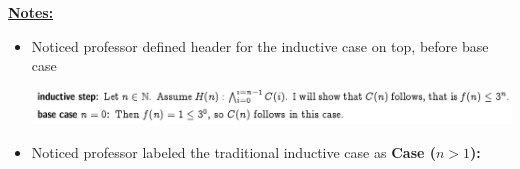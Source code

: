 \documentclass[12pt]{article}
\begin{document}
\bigskip

\underline{\textbf{Notes:}}

\bigskip

\begin{itemize}
    \item Noticed professor defined header for the inductive case on top, before base case

    \begin{center}
    \includegraphics[width=\linewidth]{images/worksheet_2_question_3_note_1.png}
    \end{center}

    \item Noticed professor labeled the traditional inductive case as \textbf{Case ($n > 1$):}
\end{itemize}
\end{document}
